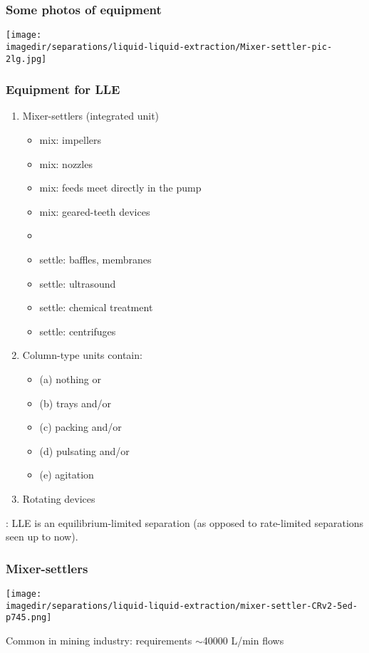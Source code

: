 \begin{frame}\frametitle{Some photos of equipment}
	\begin{center}
		\texttt{[image: \\imagedir/separations/liquid-liquid-extraction/Mixer-settler-pic-2lg.jpg]}
	\end{center}
\end{frame}

\begin{frame}\frametitle{Equipment for LLE}
	\begin{enumerate}
		\item	Mixer-settlers (integrated unit)
		\begin{itemize}
			\item	mix: impellers
			\item	mix: nozzles
			\item	mix: feeds meet directly in the pump
			\item	mix: geared-teeth devices
			\item	{\color{myOrange}{main aim: good contact; avoid droplets smaller than 2 \micron}}
			\item	settle: baffles, membranes
			\item	settle: ultrasound
			\item	settle: chemical treatment
			\item	settle: centrifuges
		\end{itemize}
		\item	Column-type units contain:
			\begin{itemize}
				\item	(a) nothing or
				\item	(b) trays and/or
				\item	(c) packing and/or
				\item	(d) pulsating and/or
				\item	(e) agitation
			\end{itemize}
		\item	Rotating devices
	\end{enumerate}
	{\color{myRed}{Important point}}: LLE is an equilibrium-limited separation (as opposed to rate-limited separations seen up to now).
\end{frame}

\begin{frame}\frametitle{Mixer-settlers}
	\begin{center}
		\texttt{[image: \\imagedir/separations/liquid-liquid-extraction/mixer-settler-CRv2-5ed-p745.png]}
	\end{center}
	Common in mining industry: requirements $\sim$40000 L/min flows
\end{frame}

